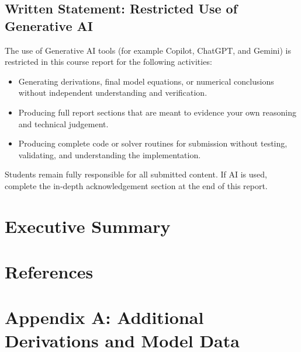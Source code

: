 \documentclass[11pt,a4paper]{article}
\begin{document}
\subsection*{Written Statement: Restricted Use of Generative AI}
The use of Generative AI tools (for example Copilot, ChatGPT, and Gemini) is restricted in this course report for the following activities:
\begin{itemize}
    \item Generating derivations, final model equations, or numerical conclusions without independent understanding and verification.
    \item Producing full report sections that are meant to evidence your own reasoning and technical judgement.
    \item Producing complete code or solver routines for submission without testing, validating, and understanding the implementation.
\end{itemize}
Students remain fully responsible for all submitted content. If AI is used, complete the in-depth acknowledgement section at the end of this report.

\tableofcontents
\newpage


\section*{Executive Summary}






\section*{References}

\newpage
\appendix

\section{Appendix A: Additional Derivations and Model Data}
\end{document}
